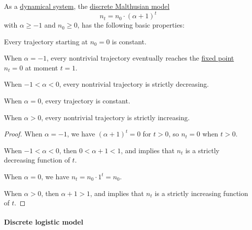 \begin{proposition}\label{thm:discrete_malthusian_model_dynamics}
  As a \hyperref[def:dynamical_system]{dynamical system}, the \hyperref[def:discrete_malthusian_model]{discrete Malthusian model}
  \begin{equation*}
    n_t = n_0 \cdot (\alpha + 1)^t
  \end{equation*}
  with \( \alpha \geq -1 \) and \( n_0 \geq 0 \), has the following basic properties:
  \begin{thmenum}
     Every trajectory starting at \( n_0 = 0 \) is constant.

     When \( \alpha = -1 \), every nontrivial trajectory eventually reaches the \hyperref[def:dynamical_system_fixed_point]{fixed point} \( n_t = 0 \) at moment \( t = 1 \).

     When \( -1 < \alpha < 0 \), every nontrivial trajectory is strictly decreasing.

     When \( \alpha = 0 \), every trajectory is constant.

     When \( \alpha > 0 \), every nontrivial trajectory is strictly increasing.
  \end{thmenum}
\end{proposition}
\begin{proof}
   When \( \alpha = -1 \), we have \( (\alpha + 1)^t = 0 \) for \( t > 0 \), so \( n_t = 0 \) when \( t > 0 \).

   When \( -1 < \alpha < 0 \), then \( 0 < \alpha + 1 < 1 \), and  implies that \( n_t \) is a strictly decreasing function of \( t \).

   When \( \alpha = 0 \), we have \( n_t = n_0 \cdot 1^t = n_0 \).

   When \( \alpha > 0 \), then \( \alpha + 1 > 1 \), and  implies that \( n_t \) is a strictly increasing function of \( t \).
\end{proof}

\paragraph{Discrete logistic model}

